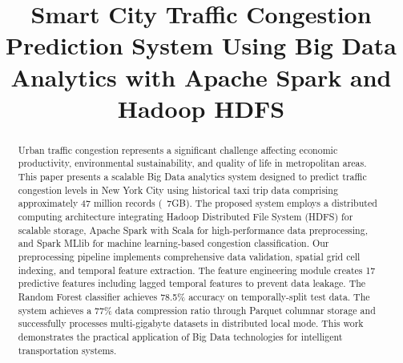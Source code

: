 \documentclass[conference]{IEEEtran}
\begin{document}
\title{Smart City Traffic Congestion Prediction System Using Big Data Analytics with Apache Spark and Hadoop HDFS}

\author{
\and
{}
\and
{}
}

\maketitle

\begin{abstract}
Urban traffic congestion represents a significant challenge affecting economic productivity, environmental sustainability, and quality of life in metropolitan areas. This paper presents a scalable Big Data analytics system designed to predict traffic congestion levels in New York City using historical taxi trip data comprising approximately 47 million records (~7GB). The proposed system employs a distributed computing architecture integrating Hadoop Distributed File System (HDFS) for scalable storage, Apache Spark with Scala for high-performance data preprocessing, and Spark MLlib for machine learning-based congestion classification. Our preprocessing pipeline implements comprehensive data validation, spatial grid cell indexing, and temporal feature extraction. The feature engineering module creates 17 predictive features including lagged temporal features to prevent data leakage. The Random Forest classifier achieves 78.5\% accuracy on temporally-split test data. The system achieves a 77\% data compression ratio through Parquet columnar storage and successfully processes multi-gigabyte datasets in distributed local mode. This work demonstrates the practical application of Big Data technologies for intelligent transportation systems.
\end{abstract}
\end{document}
